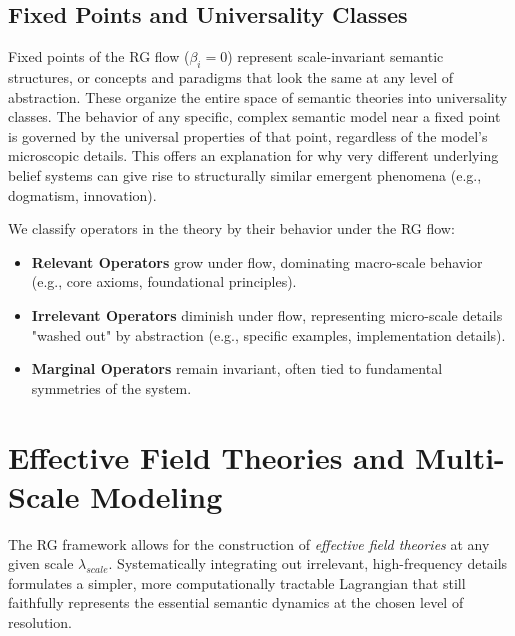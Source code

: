 
\subsection{Fixed Points and Universality Classes}
\label{15.3.1:fixed_points_and_universality_classes}

Fixed points of the RG flow (\(\beta_i = 0\)) represent scale-invariant semantic structures, or concepts and paradigms that look the same at any level of abstraction. These organize the entire space of semantic theories into universality classes. The behavior of any specific, complex semantic model near a fixed point is governed by the universal properties of that point, regardless of the model's microscopic details. This offers an explanation for why very different underlying belief systems can give rise to structurally similar emergent phenomena (e.g., dogmatism, innovation).

We classify operators in the theory by their behavior under the RG flow:

\begin{itemize}

    \item \textbf{Relevant Operators} grow under flow, dominating macro-scale behavior (e.g., core axioms, foundational principles).

    \item \textbf{Irrelevant Operators} diminish under flow, representing micro-scale details "washed out" by abstraction (e.g., specific examples, implementation details).

    \item \textbf{Marginal Operators} remain invariant, often tied to fundamental symmetries of the system.

\end{itemize}


\section{Effective Field Theories and Multi-Scale Modeling}
\label{15.4:effective_field_theories_and_multi_scale_modeling}

The RG framework allows for the construction of \textit{effective field theories} at any given scale \(\lambda_{scale}\). Systematically integrating out irrelevant, high-frequency details formulates a simpler, more computationally tractable Lagrangian that still faithfully represents the essential semantic dynamics at the chosen level of resolution.

